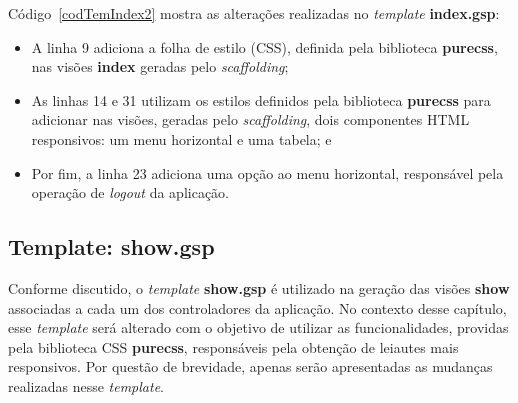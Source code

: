 \noindent  Código~\ref{codTemIndex2}  mostra as  alterações  realizadas no  {\it
  template} {\bf index.gsp}: 

\begin{itemize}

\vspace{0.5cm}

\item A linha 9 adiciona a  folha de estilo (CSS), definida pela biblioteca {\bf
  purecss}, nas visões {\bf index} geradas pelo {\it scaffolding}; 

\vspace{0.5cm}

\item  As linhas  14 e  31 utilizam  os estilos  definidos pela  biblioteca {\bf
  purecss}  para adicionar  nas  visões, geradas  pelo  {\it scaffolding},  dois
  componentes HTML responsivos: um menu horizontal e uma tabela; e

\vspace{0.5cm} 

\item Por  fim, a linha  23 adiciona uma  opção ao menu  horizontal, responsável
  pela operação de {\it logout} da aplicação.  

\end{itemize}

\newpage

\subsection{Template: show.gsp}

\vspace{0.5cm}

Conforme discutido, o  {\it template} {\bf show.gsp} é  utilizado na geração das
visões  {\bf show}  associadas a  cada um  dos controladores  da  aplicação.  No
contexto desse  capítulo, esse  {\it template} será  alterado com o  objetivo de
utilizar  as  funcionalidades,  providas  pela  biblioteca  CSS  {\bf  purecss},
responsáveis  pela  obtenção  de  leiautes  mais responsivos.   Por  questão  de
brevidade, apenas serão apresentadas as mudanças realizadas nesse {\it template}.

